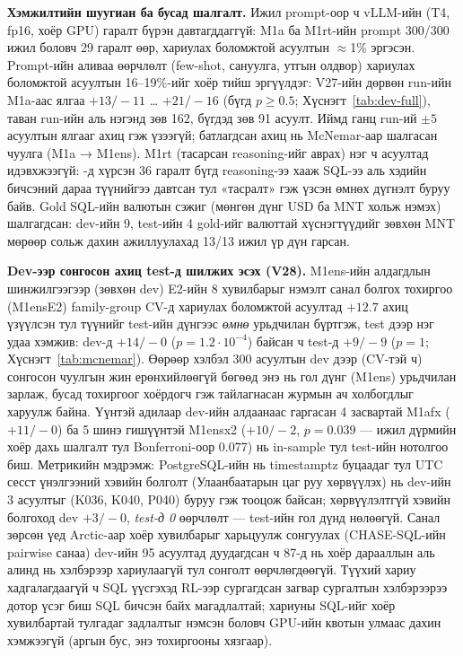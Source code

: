 \textbf{Хэмжилтийн шуугиан ба бусад шалгалт.} Ижил prompt-оор ч vLLM-ийн (T4, fp16, хоёр GPU) гаралт бүрэн давтагддаггүй:
M1a ба M1rt-ийн prompt 300/300 ижил боловч 29 гаралт өөр, хариулах боломжтой асуултын $\approx$1\% эргэсэн. Prompt-ийн аливаа
өөрчлөлт (few-shot, сануулга, утгын олдвор) хариулах боломжтой асуултын 16--19\%-ийг хоёр тийш эргүүлдэг: V27-ийн дөрвөн run-ийн
M1a-аас ялгаа $+13/-11$ … $+21/-16$ (бүгд $p \ge 0.5$; Хүснэгт~\ref{tab:dev-full}), таван run-ийн аль нэгэнд зөв 162, бүгдэд
зөв 91 асуулт. Иймд ганц run-ий $\pm5$ асуултын ялгааг ахиц гэж үзээгүй; батлагдсан ахиц нь McNemar-аар шалгасан чуулга
(M1a → M1ens). M1rt (тасарсан reasoning-ийг аврах) нэг ч асуултад идэвхжээгүй: -д хүрсэн 36 гаралт бүгд
reasoning-ээ хааж SQL-ээ аль хэдийн бичсэний дараа түүнийгээ давтсан тул «тасралт» гэж үзсэн өмнөх дүгнэлт буруу байв.
Gold SQL-ийн валютын сэжиг (мөнгөн дүнг USD ба MNT хольж нэмэх) шалгагдсан: dev-ийн 9, test-ийн 4 gold-ийг валюттай
хүснэгтүүдийг зөвхөн MNT мөрөөр сольж дахин ажиллуулахад 13/13 ижил үр дүн гарсан.

\textbf{Dev-ээр сонгосон ахиц test-д шилжих эсэх (V28).} M1ens-ийн алдагдлын шинжилгээгээр (зөвхөн dev) E2-ийн 8 хувилбарыг
нэмэлт санал болгох тохиргоо (M1ensE2) family-group CV-д хариулах боломжтой асуултад $+12.7$ ахиц үзүүлсэн тул түүнийг test-ийн
дүнгээс \emph{өмнө} урьдчилан бүртгэж, test дээр нэг удаа хэмжив: dev-д $+14/-0$ ($p = 1.2\cdot10^{-4}$) байсан ч test-д
$+9/-9$ ($p = 1$; Хүснэгт~\ref{tab:mcnemar}). Өөрөөр хэлбэл 300 асуултын dev дээр (CV-тэй ч) сонгосон чуулгын жин ерөнхийлөөгүй
бөгөөд энэ нь гол дүнг (M1ens) урьдчилан зарлаж, бусад тохиргоог хоёрдогч гэж тайлагнасан журмын ач холбогдлыг харуулж байна.
Үүнтэй адилаар dev-ийн алдаанаас гаргасан 4 засвартай M1afx ($+11/-0$) ба 5 шинэ гишүүнтэй M1ensx2 ($+10/-2$, $p = 0.039$ ---
ижил дүрмийн хоёр дахь шалгалт тул Bonferroni-оор 0.077) нь in-sample тул test-ийн нотолгоо биш. Метрикийн мэдрэмж: PostgreSQL-ийн
 нь timestamptz буцаадаг тул UTC сесст үнэлгээний хэвийн болголт (Улаанбаатарын цаг руу хөрвүүлэх) нь
dev-ийн 3 асуултыг (K036, K040, P040) буруу гэж тооцож байсан; хөрвүүлэлтгүй хэвийн болгоход dev $+3/-0$, \emph{test-д 0}
өөрчлөлт --- test-ийн гол дүнд нөлөөгүй. Санал зөрсөн үед Arctic-аар хоёр хувилбарыг харьцуулж сонгуулах (CHASE-SQL-ийн
pairwise санаа) dev-ийн 95 асуултад дуудагдсан ч 87-д нь хоёр дарааллын аль алинд нь  хэлбэрээр
хариулаагүй тул сонголт өөрчлөгдөөгүй. Түүхий хариу хадгалагдаагүй ч SQL үүсгэхэд RL-ээр сургагдсан загвар сургалтын
хэлбэрээрээ  дотор үсэг биш SQL бичсэн байх магадлалтай; хариуны SQL-ийг хоёр хувилбартай тулгадаг задлалтыг
нэмсэн боловч GPU-ийн квотын улмаас дахин хэмжээгүй (аргын бус, энэ тохиргооны хязгаар).


